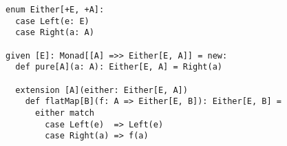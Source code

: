 \begin{algorithm}

\begin{verbatim}
enum Either[+E, +A]:
  case Left(e: E)
  case Right(a: A)

given [E]: Monad[[A] =>> Either[E, A]] = new:
  def pure[A](a: A): Either[E, A] = Right(a)

  extension [A](either: Either[E, A])
    def flatMap[B](f: A => Either[E, B]): Either[E, B] =
      either match
        case Left(e)  => Left(e)
        case Right(a) => f(a)
\end{verbatim}

\caption{Either monad in Scala. %
\label{monad:either}}
\end{algorithm}